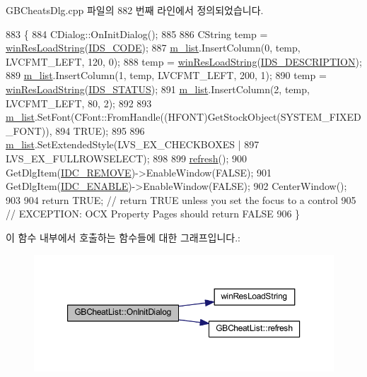 G\+B\+Cheats\+Dlg.\+cpp 파일의 882 번째 라인에서 정의되었습니다.


\begin{DoxyCode}
883 \{
884   CDialog::OnInitDialog();
885 
886   CString temp = \mbox{\hyperlink{_win_res_util_8cpp_a416e85e80ab9b01376e87251c83d1a5a}{winResLoadString}}(\mbox{\hyperlink{resource_8h_aee47536b52a339fba2efc4f2c2a0f778}{IDS\_CODE}});
887   \mbox{\hyperlink{class_g_b_cheat_list_aca0eaf2ff30100f5d11e4c80193ad90e}{m\_list}}.InsertColumn(0, temp, LVCFMT\_LEFT, 120, 0);
888   temp = \mbox{\hyperlink{_win_res_util_8cpp_a416e85e80ab9b01376e87251c83d1a5a}{winResLoadString}}(\mbox{\hyperlink{resource_8h_a30dec8e329a793933fd5e6bdb8bcfc9b}{IDS\_DESCRIPTION}});
889   \mbox{\hyperlink{class_g_b_cheat_list_aca0eaf2ff30100f5d11e4c80193ad90e}{m\_list}}.InsertColumn(1, temp, LVCFMT\_LEFT, 200, 1);
890   temp = \mbox{\hyperlink{_win_res_util_8cpp_a416e85e80ab9b01376e87251c83d1a5a}{winResLoadString}}(\mbox{\hyperlink{resource_8h_a7357542eb0bf26af3d625a620dc96b3a}{IDS\_STATUS}});
891   \mbox{\hyperlink{class_g_b_cheat_list_aca0eaf2ff30100f5d11e4c80193ad90e}{m\_list}}.InsertColumn(2, temp, LVCFMT\_LEFT, 80, 2);
892   
893   \mbox{\hyperlink{class_g_b_cheat_list_aca0eaf2ff30100f5d11e4c80193ad90e}{m\_list}}.SetFont(CFont::FromHandle((HFONT)GetStockObject(SYSTEM\_FIXED\_FONT)),
894                  TRUE);
895 
896   \mbox{\hyperlink{class_g_b_cheat_list_aca0eaf2ff30100f5d11e4c80193ad90e}{m\_list}}.SetExtendedStyle(LVS\_EX\_CHECKBOXES |
897                           LVS\_EX\_FULLROWSELECT);
898   
899   \mbox{\hyperlink{class_g_b_cheat_list_a248cc28fa5e392d2f55d0f66ff6c5821}{refresh}}();
900   GetDlgItem(\mbox{\hyperlink{resource_8h_aa8441a495432bef29886eed49bbaa08c}{IDC\_REMOVE}})->EnableWindow(FALSE);
901   GetDlgItem(\mbox{\hyperlink{resource_8h_a093c54af5e55f25a680ada00f278ac80}{IDC\_ENABLE}})->EnableWindow(FALSE);
902   CenterWindow();
903   
904   \textcolor{keywordflow}{return} TRUE;  \textcolor{comment}{// return TRUE unless you set the focus to a control}
905                 \textcolor{comment}{// EXCEPTION: OCX Property Pages should return FALSE}
906 \}
\end{DoxyCode}
이 함수 내부에서 호출하는 함수들에 대한 그래프입니다.\+:
\nopagebreak
\begin{figure}[H]
\begin{center}
\leavevmode
\includegraphics[width=350pt]{class_g_b_cheat_list_a3adbb125356d48a379d2e60609fb775f_cgraph}
\end{center}
\end{figure}
